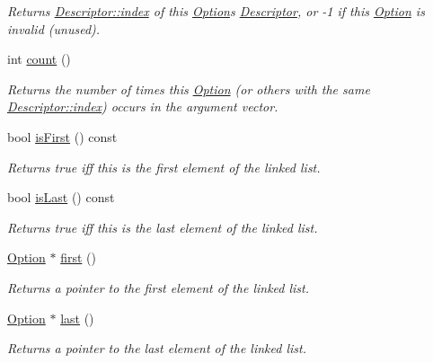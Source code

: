 \begin{DoxyCompactItemize}
\begin{DoxyCompactList}\small\item\em Returns \hyperlink{structoption_1_1Descriptor_a1fee8ac44f529c99ac2b1149b4c391b1}{Descriptor\+::index} of this \hyperlink{classoption_1_1Option}{Option}\textquotesingle{}s \hyperlink{structoption_1_1Descriptor}{Descriptor}, or -\/1 if this \hyperlink{classoption_1_1Option}{Option} is invalid (unused). \end{DoxyCompactList}\item 
int \hyperlink{classoption_1_1Option_a8a632dcd89af60fe0806deb756c08f14}{count} ()
\begin{DoxyCompactList}\small\item\em Returns the number of times this \hyperlink{classoption_1_1Option}{Option} (or others with the same \hyperlink{structoption_1_1Descriptor_a1fee8ac44f529c99ac2b1149b4c391b1}{Descriptor\+::index}) occurs in the argument vector. \end{DoxyCompactList}\item 
bool \hyperlink{classoption_1_1Option_aee7a11f90cf4b70f65fb6bdf4db2c922}{is\+First} () const 
\begin{DoxyCompactList}\small\item\em Returns true iff this is the first element of the linked list. \end{DoxyCompactList}\item 
bool \hyperlink{classoption_1_1Option_ad60789506c3df60dedd4a006af56ece9}{is\+Last} () const 
\begin{DoxyCompactList}\small\item\em Returns true iff this is the last element of the linked list. \end{DoxyCompactList}\item 
\hyperlink{classoption_1_1Option}{Option} $\ast$ \hyperlink{classoption_1_1Option_abb4e13cd7c90999c8a6b1f871cece283}{first} ()
\begin{DoxyCompactList}\small\item\em Returns a pointer to the first element of the linked list. \end{DoxyCompactList}\item 
\hyperlink{classoption_1_1Option}{Option} $\ast$ \hyperlink{classoption_1_1Option_afe2aff68191e55b59c53fac3dbbcd7c3}{last} ()
\begin{DoxyCompactList}\small\item\em Returns a pointer to the last element of the linked list. \end{DoxyCompactList}\item 

\end{DoxyCompactItemize}
